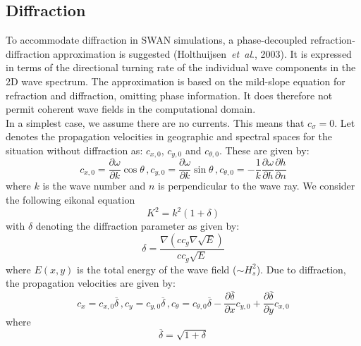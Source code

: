 \documentclass[12pt]{book}
\begin{document}
\subsection{Diffraction} \label{sec:diffrac}

To accommodate diffraction in SWAN simulations, a phase-decoupled refraction-diffraction approximation
is suggested (Holthuijsen~{\it et~al}., 2003). It is expressed in terms of the directional turning rate
of the individual wave components in the 2D wave spectrum. The approximation is based on the mild-slope
equation for refraction and diffraction, omitting phase information. It does therefore not permit coherent
wave fields in the computational domain.
\\[2ex]
\noindent
In a simplest case, we assume there are no currents. This means that $c_\sigma = 0$. Let denotes the
propagation velocities in geographic and spectral spaces for the situation without diffraction as:
$c_{x,0}$, $c_{y,0}$ and $c_{\theta,0}$. These are given by:
\begin{equation}
  c_{x,0} = \frac{\partial \omega}{\partial k} \cos\theta\,,
  c_{y,0} = \frac{\partial \omega}{\partial k} \sin\theta\,,
  c_{\theta,0} = -\frac{1}{k}\frac{\partial \omega}{\partial h} \frac{\partial h}{\partial n}
  \label{eq3-42}
\end{equation}
where $k$ is the wave number and $n$ is perpendicular to the wave ray. We consider the following eikonal
equation
\begin{equation}
  K^2 = k^2 (1+\delta)
  \label{eq3-43}
\end{equation}
with $\delta$ denoting the diffraction parameter as given by:
\begin{equation}
  \delta = \frac{\nabla (c c_g \nabla \sqrt{E})}{c c_g \sqrt{E}}
  \label{eq3-44}
\end{equation}
where $E(x,y)$ is the total energy of the wave field ($\sim H^2_s$).
Due to diffraction, the propagation velocities are given by:
\begin{equation}
  c_x = c_{x,0} \overline{\delta}\,,
  c_y = c_{y,0} \overline{\delta}\,,
  c_\theta = c_{\theta,0} \overline{\delta} - \frac{\partial \overline{\delta}}{\partial x}
   c_{y,0} + \frac{\partial \overline{\delta}}{\partial y}c_{x,0}
  \label{eq3-45}
\end{equation}
where
\begin{equation}
  \overline{\delta} = \sqrt{1+\delta}
  \label{eq3-46}
\end{equation}
\\[2ex]
\end{document}
